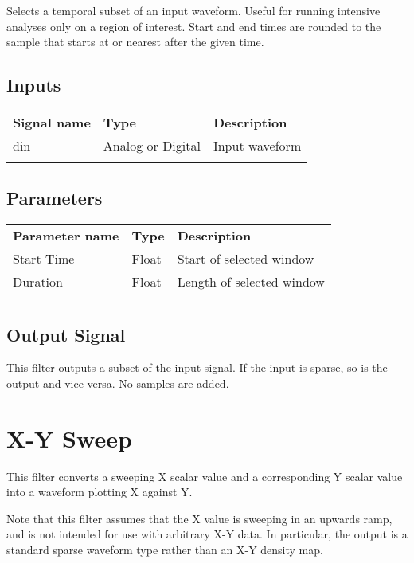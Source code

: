 Selects a temporal subset of an input waveform. Useful for running intensive analyses only on a region of interest.
Start and end times are rounded to the sample that starts at or nearest after the given time.

\subsection{Inputs}

\begin{tabularx}{16cm}{llX}
\thickhline
\textbf{Signal name} & \textbf{Type} & \textbf{Description} \\
\thickhline
din & Analog or Digital & Input waveform \\
\thickhline
\end{tabularx}

\subsection{Parameters}

\begin{tabularx}{16cm}{llX}
\thickhline
\textbf{Parameter name} & \textbf{Type} & \textbf{Description} \\
\thickhline
Start Time & Float & Start of selected window \\
\thinhline
Duration & Float & Length of selected window \\
\thickhline
\end{tabularx}

\subsection{Output Signal}

This filter outputs a subset of the input signal. If the input is sparse, so is the output and vice versa. No samples
are added.

\pagebreak
\section{X-Y Sweep}

This filter converts a sweeping X scalar value and a corresponding Y scalar value into a waveform plotting X against Y.

Note that this filter assumes that the X value is sweeping in an upwards ramp, and is not intended for use with
arbitrary X-Y data. In particular, the output is a standard sparse waveform type rather than an X-Y density map.
